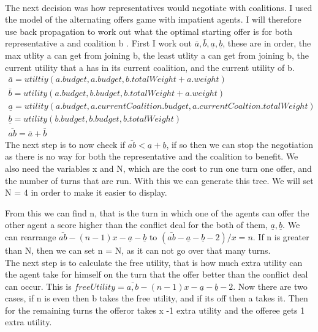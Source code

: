\\
The next decision was how representatives would negotiate with coalitions. I used the model of the alternating offers game with impatient agents. I will therefore use back propagation to work out what the optimal starting offer is for both representative a and coalition b . First I work out  $ \bar{a}, \bar{b}, \underline{a}, \underline{b} $, these are in order, the max utlity a can get from joining b, the least utlity a can get from joining b, the current utility that a has in its current coalition, and the current utility of b.
\begin{gather*}
\bar{a} = utiltiy(a.budget,a.budget,b.totalWeight +  a.weight) \\
\bar{b} = utility(a.budget,b.budget,b.totalWeight +  a.weight) \\
\underline{a} = utility(a.budget,a.currentCoalition.budget,a.currentCoaltion.totalWeight) \\
\underline{b} = utility(b.budget,b.budget,b.totalWeight) \\ 
\bar{ab} = \bar{a} + \bar{b} 
\end{gather*}
The next step is to now check if  $\bar{ab} < \underline{a} + \underline{b}$, if so then we can stop the negotiation as there is no way for both the representative and the coalition to benefit. We also need the variables x and N, which are the cost to run one turn one offer, and the number of turns that are run. With this we can generate this tree. We will set N = 4 in order to make it easier to display.
\\

From this we can find n, that is the turn in which one of the agents can offer the other agent a score higher than the conflict deal for the both of them, ${\underline{a},\underline{b}}$. We can rearrange $\bar{ab} - (n-1)x - \underline{a} - \underline{b}$ to $(\bar{ab} - \underline{a} - \underline{b} - 2) / x = n$. If n is greater than N, then we can set n = N, as it can not go over that many turns.
\\
The next step is to calculate the free utility, that is how much extra utility can the agent take for himself on the turn that the offer better than the conflict deal can occur. This is $freeUtility = \bar{a,b} - (n-1)x - \underline{a} - \underline{b} - 2$. Now there are two cases, if n is even then b takes the free utility, and if its off then a takes it. Then for the remaining turns the offeror takes x -1 extra utility and the offeree gets 1 extra utility. 






